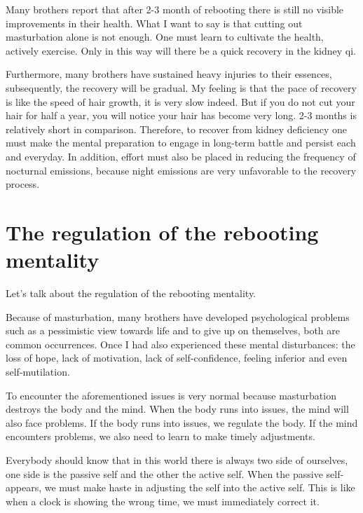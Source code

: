 \documentclass[
]{book}
\begin{document}
Many brothers report that after 2-3 month of rebooting there is still no visible improvements in their health. What I want to say is that cutting out masturbation alone is not enough. One must learn to cultivate the health, actively exercise. Only in this way will there be a quick recovery in the kidney qi.

Furthermore, many brothers have sustained heavy injuries to their essences, subsequently, the recovery will be gradual. My feeling is that the pace of recovery is like the speed of hair growth, it is very slow indeed. But if you do not cut your hair for half a year, you will notice your hair has become very long. 2-3 months is relatively short in comparison. Therefore, to recover from kidney deficiency one must make the mental preparation to engage in long-term battle and persist each and everyday. In addition, effort must also be placed in reducing the frequency of nocturnal emissions, because night emissions are very unfavorable to the recovery process.

\hypertarget{the-regulation-of-the-rebooting-mentality}{%
\section{The regulation of the rebooting mentality}\label{the-regulation-of-the-rebooting-mentality}}

Let's talk about the regulation of the rebooting mentality.

Because of masturbation, many brothers have developed psychological problems such as a pessimistic view towards life and to give up on themselves, both are common occurrences. Once I had also experienced these mental disturbances: the loss of hope, lack of motivation, lack of self-confidence, feeling inferior and even self-mutilation.

To encounter the aforementioned issues is very normal because masturbation destroys the body and the mind. When the body runs into issues, the mind will also face problems. If the body runs into issues, we regulate the body. If the mind encounters problems, we also need to learn to make timely adjustments.

Everybody should know that in this world there is always two side of ourselves, one side is the passive self and the other the active self. When the passive self-appears, we must make haste in adjusting the self into the active self. This is like when a clock is showing the wrong time, we must immediately correct it.
\end{document}
